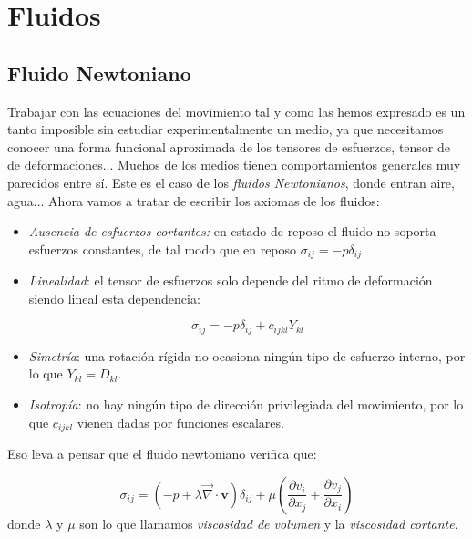 \documentclass[12pt,a4paper]{article}
\numberwithin{equation}{section}
\numberwithin{figure}{section}
\newcommand{\parentesis}[1]{\left( #1  \right)}
\newcommand{\parciales}[2]{\frac{\partial #1}{\partial #2}}
\newcommand{\vn}{\mathbf{v}}
\begin{document}
\newpage



\section{Fluidos}

\subsection{Fluido Newtoniano}

Trabajar con las ecuaciones del movimiento tal y como las hemos expresado es un tanto imposible sin estudiar experimentalmente un medio, ya que necesitamos conocer  una forma funcional aproximada de los tensores de esfuerzos, tensor de de deformaciones... Muchos de los medios tienen comportamientos generales muy parecidos entre sí. Este es el caso de los \textit{fluidos Newtonianos}, donde entran aire, agua...  Ahora vamos a tratar de escribir los axiomas de los fluidos:

\begin{itemize}
\item \textit{Ausencia de esfuerzos cortantes:} en estado de reposo el fluido no soporta esfuerzos constantes, de tal modo que en reposo $\sigma_{ij} = - p \delta_{ij}$
\item \textit{Linealidad}: el tensor de esfuerzos solo depende del ritmo de deformación siendo lineal esta dependencia:

\begin{equation}
\sigma_{ij} = - p \delta_{ij} + c_{ijkl} Y_{kl}
\end{equation}

\item \textit{Simetría}: una rotación rígida no ocasiona ningún tipo de esfuerzo interno, por lo que $Y_{kl}=D_{kl}$. 

\item \textit{Isotropía}: no hay ningún tipo de dirección privilegiada del movimiento, por lo que $c_{ijkl}$ vienen dadas por funciones escalares. 
\end{itemize}

Eso leva a pensar que el fluido newtoniano verifica que:

\begin{equation}
\sigma_{ij} = (-p + \lambda \vec{\nabla} \cdot \vn) \delta_{ij}  + \mu \parentesis{\parciales{v_i}{x_j} + \parciales{v_ j}{x_i}} \label{Ec:4.1.0.002}
\end{equation}
donde $\lambda$ y $\mu$ son lo que llamamos \textit{viscosidad de volumen} y la \textit{viscosidad cortante}.
\end{document}
